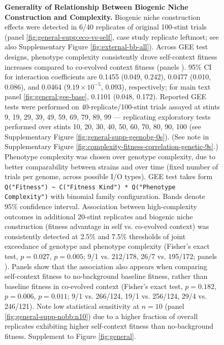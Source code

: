 \begin{figure}
\caption{%
\textbf{Generality of Relationship Between Biogenic Niche Construction and Complexity.}
\footnotesize
Biogenic niche construction effects were detected in 6/40 replicates of original 100-stint trials (panel \ref{fig:general-supp:eco-vs-self}, case study replicate leftmost; see also Supplementary Figure \ref{fig:external-bb-all}).
Across GEE test designs, phenotype complexity consistently drove self-context fitness increases compared to co-evolved context fitness (panels ).
95\% CI for interaction coefficients are 0.1455 (0.049, 0.242), 0.0477 (0.010, 0.086), and 0.0464 ($9.19\times10^{-5}$, 0.093), respectively; for main text panel \ref{fig:general:gee-base}, 0.1101 (0.048, 0.172).
Reported GEE tests were performed on 40-replicate/100-stint trials assayed at stints 9, 19, 29, 39, 49, 59, 69, 79, 89, 99 --- replicating exploratory tests performed over stints 10, 20, 30, 40, 50, 60, 70, 80, 90, 100 (see Supplementary Figure \ref{fig:general-supp-geenobg-0s}).
(See note in Supplementary Figure \ref{fig:complexity-fitness-correlation-genetic-9s}.)
Phenotype complexity was chosen over genotype complexity, due to better comparability between strains and over time (fixed number of trials per genome, across possible I/O types).
GEE test takes form \texttt{Q("Fitness") \textasciitilde{} C("Fitness Kind") * Q("Phenotype Complexity")} with binomial family configuration.
Bands denote 95\% confidence interval.
Association between high-complexity outcomes in additional 20-stint replicates and biogenic niche construction (fitness advantage in self vs. co-evolved context) was consistently detected at 2.5\% and 7.5\% thresholds of joint exceedance of genotype and phenotype complexity (Fisher's exact test, $p=0.027$, $p=0.005$; 9/1 vs. 212/178, 26/7 vs. 195/172; panels ).
Panels  show that the association also appears when comparing self-context fitness to no-background baseline fitness, rather than baseline fitness in co-evolved context (Fisher's exact test, $p = 0.182$, $p = 0.006$, $p = 0.011$; 9/1 vs. 266/124, 19/1 vs. 256/124, 29/4 vs. 246/121).
Note low statistical sensitivity at $n=10$ (panel \ref{fig:general-supp-nobb:n10}) due to a higher fraction of overall replicates exhibiting higher self-context fitness than no-background fitness.
Supplement to Figure \ref{fig:general}.
}
\label{fig:general-supp}

\end{figure}

